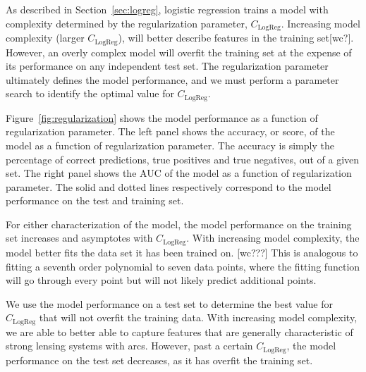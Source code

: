 \documentclass{emulateapj}
\begin{document}
As described in Section~\ref{sec:logreg}, logistic regression trains a
model with complexity determined by the regularization parameter,
$C_\text{LogReg}$.  Increasing model complexity (larger
$C_\text{LogReg}$), will better describe features in the training
set[wc?].  However, an overly complex model will overfit the training
set at the expense of its performance on any independent test set.
The regularization parameter ultimately defines the model performance,
and we must perform a parameter search to identify the optimal value
for $C_\text{LogReg}$.

Figure~\ref{fig:regularization} shows the model performance as a
function of regularization parameter.  The left panel shows the
accuracy, or score, of the model as a function of regularization
parameter.  The accuracy is simply the percentage of correct
predictions, true positives and true negatives, out of a given set.
The right panel shows the AUC of the model as a function of
regularization parameter.  The solid and dotted lines respectively
correspond to the model performance on the test and training set.

For either characterization of the model, the model performance on the
training set increases and asymptotes with $C_\text{LogReg}$.  With
increasing model complexity, the model better fits the data set it has
been trained on.  [wc???] This is analogous to fitting a seventh order
polynomial to seven data points, where the fitting function will go
through every point but will not likely predict additional points.

We use the model performance on a test set to determine the best value
for $C_\text{LogReg}$ that will not overfit the training data.  With
increasing model complexity, we are able to better able to capture
features that are generally characteristic of strong lensing systems
with arcs.  However, past a certain $C_\text{LogReg}$, the model
performance on the test set decreases, as it has overfit the training
set.
\end{document}
